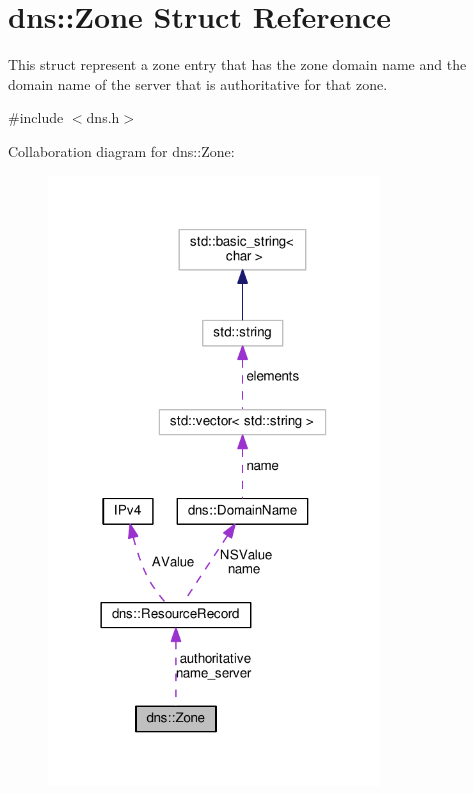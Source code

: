 \hypertarget{structdns_1_1Zone}{}\section{dns\+:\+:Zone Struct Reference}
\label{structdns_1_1Zone}


This struct represent a zone entry that has the zone domain name and the domain name of the server that is authoritative for that zone.  




{\ttfamily \#include $<$dns.\+h$>$}



Collaboration diagram for dns\+:\+:Zone\+:\nopagebreak
\begin{figure}[H]
\begin{center}
\leavevmode
\includegraphics[width=249pt]{structdns_1_1Zone__coll__graph}
\end{center}
\end{figure}

